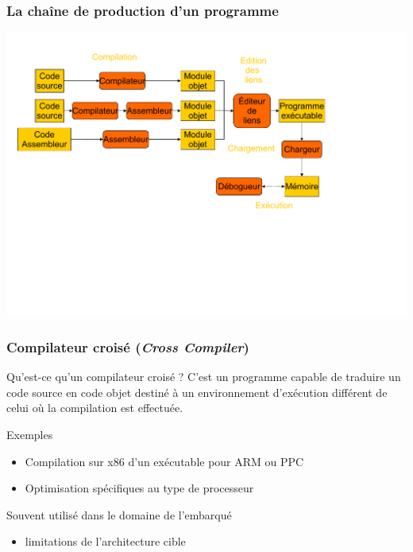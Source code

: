 \begin{frame}
\frametitle{La chaîne de production d'un programme}
\includegraphics[width=\textwidth]{../illustration/chaine_prod_pgm.pdf}
\end{frame}


\begin{frame}
\frametitle{Compilateur croisé (\textit{Cross Compiler})}

\begin{block}{Qu'est-ce qu'un compilateur croisé ?}
C'est un programme capable de traduire un code source en code objet destiné à un environnement d'exécution différent de celui où la compilation est effectuée.
\end{block}

\begin{exampleblock}{Exemples}
\begin{itemize}
\item Compilation sur x86 d'un exécutable pour ARM ou PPC
\item Optimisation spécifiques au type de processeur
\end{itemize}
\end{exampleblock}
Souvent utilisé dans le domaine de l'embarqué
\begin{itemize}
\item limitations de l'architecture cible
\end{itemize}
\end{frame}

